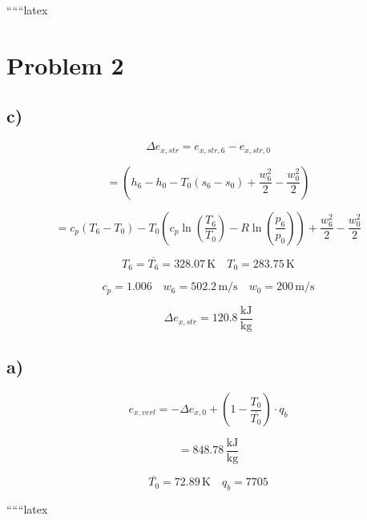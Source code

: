 ``````latex


\section*{Problem 2}

\subsection*{c)}

\[
\Delta e_{x,str} = e_{x,str,6} - e_{x,str,0}
\]

\[
= (h_6 - h_0 - T_0 (s_6 - s_0) + \frac{w_6^2}{2} - \frac{w_0^2}{2})
\]

\[
= c_p (T_6 - T_0) - T_0 (c_p \ln \left( \frac{T_6}{T_0} \right) - R \ln \left( \frac{p_6}{p_0} \right)) + \frac{w_6^2}{2} - \frac{w_0^2}{2}
\]

\[
T_6 = \overline{T_6} = 328.07 \, \text{K} \quad T_0 = 283.75 \, \text{K}
\]

\[
c_p = 1.006 \quad w_6 = 502.2 \, \text{m/s} \quad w_0 = 200 \, \text{m/s}
\]

\[
\Delta e_{x,str} = 120.8 \, \frac{\text{kJ}}{\text{kg}}
\]

\subsection*{a)}

\[
e_{x,verl} = -\Delta e_{x,0} + \left( 1 - \frac{T_0}{\overline{T_0}} \right) \cdot q_b
\]

\[
= 848.78 \, \frac{\text{kJ}}{\text{kg}}
\]

\[
\overline{T_0} = 72.89 \, \text{K} \quad q_b = 7705
\]

``````latex


